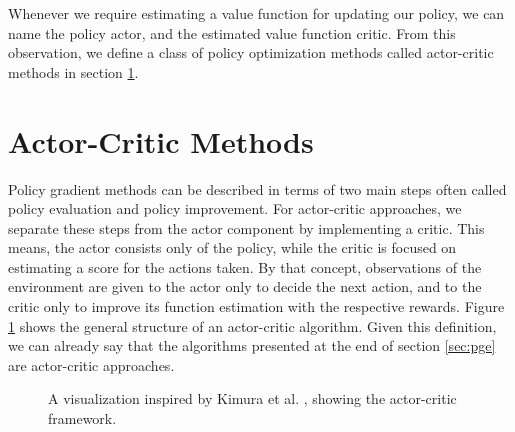 \documentclass[conference, final]{IEEEtran}
\begin{document}
Whenever we require estimating a value function for updating our policy, we can name the policy actor, and the estimated value function critic. 
From this observation, we define a class of policy optimization methods called actor-critic methods in section \ref{sec:ac}.


\section{Actor-Critic Methods} 
\label{sec:ac}

Policy gradient methods can be described in terms of two main steps often called policy evaluation and policy improvement. 
For actor-critic approaches, we separate these steps from the actor component by implementing a critic. 
This means, the actor consists only of the policy, while the critic is focused on estimating a score for the actions taken. 
By that concept, observations of the environment are given to the actor only to decide the next action, and to the critic only to improve its function estimation with the respective rewards. 
Figure \ref{fig:ac} shows the general structure of an actor-critic algorithm.
Given this definition, we can already say that the algorithms presented at the end of section \ref{sec:pge} are actor-critic approaches.

\begin{figure}
  \begin{center}
  \end{center}
  \caption{A visualization inspired by Kimura et al. \cite{Kimura1998AnAO}, showing the actor-critic framework.} \label{fig:ac}
\end{figure}
\end{document}
